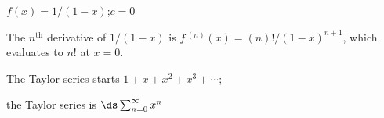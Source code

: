 {$f(x) = 1/(1-x)$;\quad $c=0$
}
{The $n^\text{th}$ derivative of $1/(1-x)$ is $f\,^{(n)}(x) = (n)!/(1-x)^{n+1}$, which evaluates to $n!$ at $x=0$. 

The Taylor series starts $1+x+x^2+x^3+\cdots$; 

the Taylor series is $\ds \sum_{n=0}^\infty x^n$
}